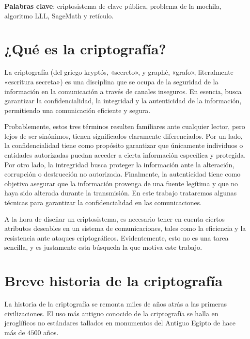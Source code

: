 %

\textbf{Palabras clave}: criptosistema de clave pública, problema de la mochila, algoritmo LLL, SageMath y retículo.

\section*{¿Qué es la criptografía?}

La criptografía (del griego kryptós, «secreto», y graphé, «grafo», literalmente «escritura secreta») es una disciplina que se ocupa de la seguridad de la información en la comunicación a través de canales inseguros. En esencia, busca garantizar la confidencialidad, la integridad y la autenticidad de la información, permitiendo una comunicación eficiente y segura.

Probablemente, estos tres términos resulten familiares ante cualquier lector, pero lejos de ser sinónimos, tienen significados claramente diferenciados. Por un lado, la confidencialidad tiene como propósito garantizar que únicamente individuos o entidades autorizadas puedan acceder a cierta información específica y protegida. Por otro lado, la intregridad busca proteger la información ante la alteración, corrupción o destrucción no autorizada. Finalmente, la autenticidad tiene como objetivo asegurar que la información provenga de una fuente legítima y que no haya sido alterada durante la transmisión. En este trabajo trataremos algunas técnicas para garantizar la confidencialidad en las comunicaciones.

A la hora de diseñar un criptosistema, es necesario tener en cuenta ciertos atributos deseables en un sistema de comunicaciones, tales como la eficiencia y la resistencia ante ataques criptográficos. Evidentemente, esto no es una tarea sencilla, y es justamente esta búsqueda la que motiva este trabajo.

\section*{Breve historia de la criptografía}

La historia de la criptografía se remonta miles de años atrás a las primeras civilizaciones. El uso más antiguo conocido de la criptografía se halla en jeroglíficos no estándares tallados en monumentos del Antiguo Egipto de hace más de $4500$ años. 

